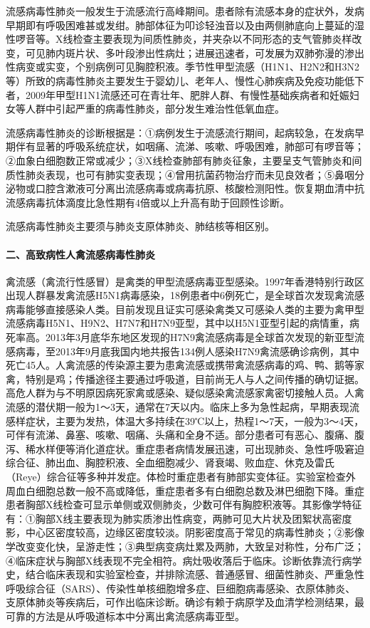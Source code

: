 流感病毒性肺炎一般发生于流感流行高峰期间。患者除有流感本身的症状外，发病早期即有呼吸困难甚或发绀。肺部体征为叩诊轻浊音以及由两侧肺底向上蔓延的湿性啰音等。X线检查主要表现为间质性肺炎，并夹杂以不同形态的支气管肺炎样改变，可见肺内斑片状、多叶段渗出性病灶；进展迅速者，可发展为双肺弥漫的渗出性病变或实变，个别病例可见胸腔积液。季节性甲型流感（H1N1、H2N2和H3N2等）所致的病毒性肺炎主要发生于婴幼儿、老年人、慢性心肺疾病及免疫功能低下者，2009年甲型H1N1流感还可在青壮年、肥胖人群、有慢性基础疾病者和妊娠妇女等人群中引起严重的病毒性肺炎，部分发生难治性低氧血症。

流感病毒性肺炎的诊断根据是：①病例发生于流感流行期间，起病较急，在发病早期伴有显著的呼吸系统症状，如咽痛、流涕、咳嗽、呼吸困难，肺部可有啰音等；②血象白细胞数正常或减少；③X线检查肺部有肺炎征象，主要呈支气管肺炎和间质性肺炎表现，也可有肺实变表现；④曾用抗菌药物治疗而未见良效者；⑤鼻咽分泌物或口腔含漱液可分离出流感病毒或病毒抗原、核酸检测阳性。恢复期血清中抗流感病毒抗体滴度比急性期有4倍或以上升高有助于回顾性诊断。

流感病毒性肺炎主要须与肺炎支原体肺炎、肺结核等相区别。

\paragraph{二、高致病性人禽流感病毒性肺炎}

禽流感（禽流行性感冒）是禽类的甲型流感病毒亚型感染。1997年香港特别行政区出现人群暴发禽流感H5N1病毒感染，18例患者中6例死亡，是全球首次发现禽流感病毒能够直接感染人类。目前发现且证实可感染禽类又可感染人类的主要为禽甲型流感病毒H5N1、H9N2、H7N7和H7N9亚型，其中以H5N1亚型引起的病情重，病死率高。2013年3月底华东地区发现的H7N9禽流感病毒是全球首次发现的新亚型流感病毒，至2013年9月底我国内地共报告134例人感染H7N9禽流感确诊病例，其中死亡45人。人禽流感的传染源主要为患禽流感或携带禽流感病毒的鸡、鸭、鹅等家禽，特别是鸡；传播途径主要通过呼吸道，目前尚无人与人之间传播的确切证据。高危人群为与不明原因病死家禽或感染、疑似感染禽流感家禽密切接触人员。人禽流感的潜伏期一般为1～3天，通常在7天以内。临床上多为急性起病，早期表现流感样症状，主要为发热，体温大多持续在39℃以上，热程1～7天，一般为3～4天，可伴有流涕、鼻塞、咳嗽、咽痛、头痛和全身不适。部分患者可有恶心、腹痛、腹泻、稀水样便等消化道症状。重症患者病情发展迅速，可出现肺炎、急性呼吸窘迫综合征、肺出血、胸腔积液、全血细胞减少、肾衰竭、败血症、休克及雷氏（Reye）综合征等多种并发症。体检时重症患者有肺部实变体征。实验室检查外周血白细胞总数一般不高或降低，重症患者多有白细胞总数及淋巴细胞下降。重症患者胸部X线检查可显示单侧或双侧肺炎，少数可伴有胸腔积液等。其影像学特征有：①胸部X线主要表现为肺实质渗出性病变，两肺可见大片状及团絮状高密度影，中心区密度较高，边缘区密度较淡。阴影密度高于常见的病毒性肺炎；②影像学改变变化快，呈游走性；③典型病变病灶累及两肺，大致呈对称性，分布广泛；④临床症状与胸部X线表现不完全相符。病灶吸收落后于临床。诊断依靠流行病学史，结合临床表现和实验室检查，并排除流感、普通感冒、细菌性肺炎、严重急性呼吸综合征（SARS）、传染性单核细胞增多症、巨细胞病毒感染、衣原体肺炎、支原体肺炎等疾病后，可作出临床诊断。确诊有赖于病原学及血清学检测结果，最可靠的方法是从呼吸道标本中分离出禽流感病毒亚型。

